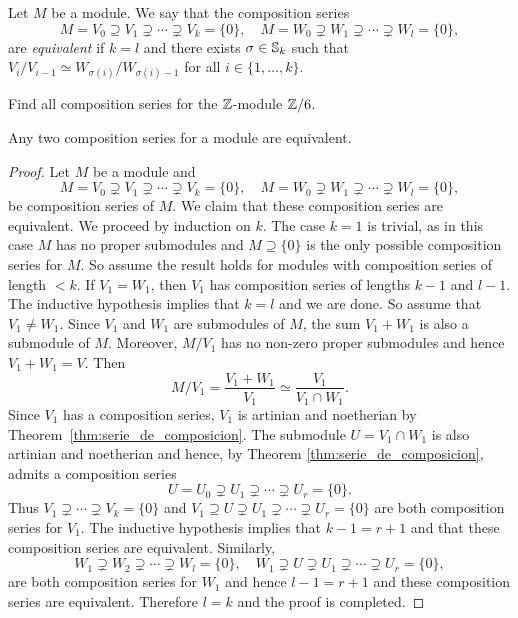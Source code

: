 \begin{definition}
    Let $M$ be a module. 
	We say that the composition series
	\[
	M=V_0\supseteq V_1\supsetneq\cdots\supsetneq V_k=\{0\},
	\quad
	M=W_0\supsetneq W_1\supsetneq\cdots\supsetneq W_l=\{0\},
	\]
	are \emph{equivalent} if $k=l$ and there exists 
	$\sigma\in\mathbb{S}_k$ such that 
	$V_{i}/V_{i-1}\simeq W_{\sigma(i)}/W_{\sigma(i)-1}$
	for all $i\in\{1,\dots,k\}$.
\end{definition}

\begin{exercise}
\label{xca:Z6}
    Find all composition series
    for the $\mathbb{Z}$-module $\mathbb{Z}/6$. 
\end{exercise}

\begin{theorem}
	\label{thm:JordanHolder}
	Any two composition series for a module are equivalent. 
\end{theorem}

\begin{proof}
    Let $M$ be a module and
    \[
		M=V_0\supsetneq V_1\supsetneq\cdots\supsetneq V_k=\{0\},
		\quad
		M=W_0\supsetneq W_1\supsetneq\cdots\supsetneq W_l=\{0\},
	\]
	be composition series of $M$. 
	We claim that these composition series are equivalent. 
	We proceed by induction on $k$. The case $k=1$ is trivial, as 
	in this case $M$ has no proper submodules and $M\supseteq\{0\}$ 
	is the only possible composition series for $M$. So
	assume the result holds for modules with composition series of length $<k$. If $V_1=W_1$, then 
	$V_1$ has composition series of lengths $k-1$ and $l-1$. The inductive hypothesis implies that 
	$k=l$ and we are done. So assume that $V_1\ne W_1$. Since $V_1$ and $W_1$ are submodules of $M$, the
	sum $V_1+W_1$ is also a submodule of $M$. Moreover, $M/V_1$ has no non-zero proper submodules
	and hence 
	$V_1+W_1=V$. Then 
	\[
		M/V_1=\frac{V_1+W_1}{V_1}\simeq\frac{V_1}{V_1\cap W_1}.
	\]
	Since $V_1$ has a composition series, $V_1$ is artinian and
	noetherian by Theorem~\ref{thm:serie_de_composicion}. The submodule $U=V_1\cap W_1$ is also 
	artinian and noetherian and hence, by Theorem \ref{thm:serie_de_composicion}, 
	admits a composition series 
	\[
		U=U_0\supsetneq U_1\supsetneq\cdots\supsetneq U_r=\{0\}.
	\]
    Thus
    $V_1\supsetneq\cdots\supsetneq V_k=\{0\}$ and  
	$V_1\supseteq U\supsetneq U_1\supsetneq\cdots\supsetneq U_r=\{0\}$ are both composition 
	series for $V_1$. The inductive hypothesis implies that 
	$k-1=r+1$ and that these composition series are equivalent. Similarly, 
	\[
		W_1\supsetneq W_2\supsetneq\cdots\supsetneq W_l=\{0\},
		\quad
		W_1\supsetneq U\supsetneq U_1\supsetneq\cdots\supsetneq U_{r}=\{0\},
	\]
    are both composition series for $W_1$ and hence $l-1=r+1$ and these composition 
    series are equivalent. Therefore $l=k$ and the proof is completed. 
\end{proof}

